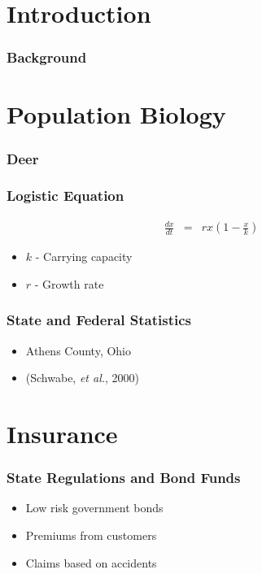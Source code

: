


\section{Introduction}

\begin{frame}
    \frametitle{Background}
\end{frame}




\section{Population Biology}

\begin{frame}
    \frametitle{Deer}
\end{frame}

\begin{frame}
    \frametitle{Logistic Equation}
	\vspace{-1cm}
	\begin{eqnarray*}
		\frac{dx}{dt} &=& rx \left( 1-\frac{x}{k} \right)
	\end{eqnarray*}
	\begin{itemize}
		\item $k$ - Carrying capacity
		\item $r$ - Growth rate
	\end{itemize}
\end{frame}


\begin{frame}
    \frametitle{State and Federal Statistics}
	\begin{itemize}
		\item Athens County, Ohio
		\item (Schwabe, \emph{et al.}, 2000)
	\end{itemize}
\end{frame}






\section{Insurance}

\begin{frame}
    \frametitle{State Regulations and Bond Funds}
	\begin{itemize}
		\item Low risk government bonds
		\item Premiums from customers
		\item Claims based on accidents
	\end{itemize}
\end{frame}